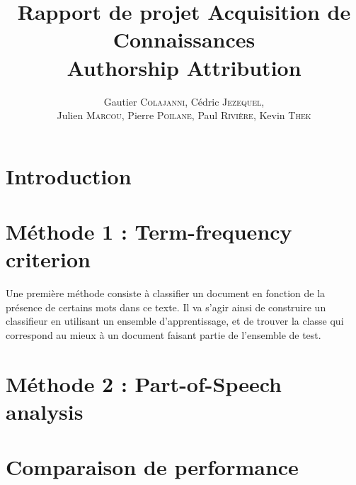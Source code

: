 \documentclass[a4paper]{article}
\author{Gautier \textsc{Colajanni}, Cédric \textsc{Jezequel},\\ Julien \textsc{Marcou}, Pierre \textsc{Poilane}, Paul \textsc{Rivière}, Kevin \textsc{Thek}}
\title{Rapport de projet Acquisition de Connaissances \\ Authorship Attribution}
\begin{document}
\maketitle

\section{Introduction}

\section{Méthode 1 : Term-frequency criterion}
Une première méthode consiste à classifier un document en fonction de la présence de certains mots dans ce texte. Il va s'agir ainsi de construire un classifieur en utilisant un ensemble d'apprentissage, et de trouver la classe qui correspond au mieux à un document faisant partie de l'ensemble de test.

\section{Méthode 2 : Part-of-Speech analysis}

\section{Comparaison de performance}
\end{document}

